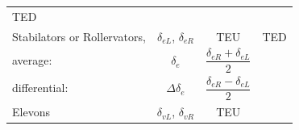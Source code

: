 \documentclass[
]{book}
\begin{document}
\begin{longtable}[]{@{}lccc@{}}
\begin{minipage}[t]{0.27\columnwidth}
TED\strut
\end{minipage}\tabularnewline
\begin{minipage}[t]{0.19\columnwidth}\raggedright
Stabilators or Rollervators,\strut
\end{minipage} & \begin{minipage}[t]{0.14\columnwidth}\centering
\(\delta_{eL}\),
\(\delta_{eR}\)\strut
\end{minipage} & \begin{minipage}[t]{0.29\columnwidth}\centering
TEU\strut
\end{minipage} & \begin{minipage}[t]{0.27\columnwidth}\centering
TED\strut
\end{minipage}\tabularnewline
\begin{minipage}[t]{0.19\columnwidth}\raggedright
average:\strut
\end{minipage} & \begin{minipage}[t]{0.14\columnwidth}\centering
\(\delta_e\)\strut
\end{minipage} & \begin{minipage}[t]{0.29\columnwidth}\centering
\[\frac{\delta_{eR} + \delta_{eL}}{2}\]\strut
\end{minipage} & \begin{minipage}[t]{0.27\columnwidth}\centering
\strut
\end{minipage}\tabularnewline
\begin{minipage}[t]{0.19\columnwidth}\raggedright
differential:\strut
\end{minipage} & \begin{minipage}[t]{0.14\columnwidth}\centering
\(\Delta\delta_e\)\strut
\end{minipage} & \begin{minipage}[t]{0.29\columnwidth}\centering
\[\frac{\delta_{eR} - \delta_{eL}}{2}\]\strut
\end{minipage} & \begin{minipage}[t]{0.27\columnwidth}\centering
\strut
\end{minipage}\tabularnewline
\begin{minipage}[t]{0.19\columnwidth}\raggedright
Elevons\strut
\end{minipage} & \begin{minipage}[t]{0.14\columnwidth}\centering
\(\delta_{vL}\),
\(\delta_{vR}\)\strut
\end{minipage} & \begin{minipage}[t]{0.29\columnwidth}\centering
TEU\strut
\end{minipage} & \begin{minipage}[t]{0.27\columnwidth}\centering

\end{minipage}
\end{longtable}
\end{document}
